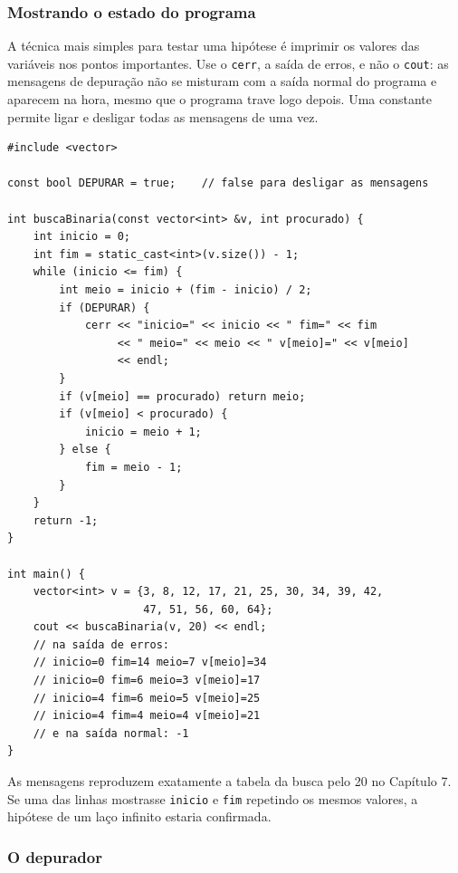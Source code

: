 \subsubsection{Mostrando o estado do programa}

A técnica mais simples para testar uma hipótese é imprimir os valores das variáveis nos pontos importantes. Use o \texttt{cerr}, a saída de erros, e não o \texttt{cout}: as mensagens de depuração não se misturam com a saída normal do programa e aparecem na hora, mesmo que o programa trave logo depois. Uma constante permite ligar e desligar todas as mensagens de uma vez.

\begin{codigo}
\begin{Verbatim}[breaklines=true, breaksymbolleft={}, fontsize=\footnotesize]
#include <vector>

const bool DEPURAR = true;    // false para desligar as mensagens

int buscaBinaria(const vector<int> &v, int procurado) {
    int inicio = 0;
    int fim = static_cast<int>(v.size()) - 1;
    while (inicio <= fim) {
        int meio = inicio + (fim - inicio) / 2;
        if (DEPURAR) {
            cerr << "inicio=" << inicio << " fim=" << fim
                 << " meio=" << meio << " v[meio]=" << v[meio]
                 << endl;
        }
        if (v[meio] == procurado) return meio;
        if (v[meio] < procurado) {
            inicio = meio + 1;
        } else {
            fim = meio - 1;
        }
    }
    return -1;
}

int main() {
    vector<int> v = {3, 8, 12, 17, 21, 25, 30, 34, 39, 42,
                     47, 51, 56, 60, 64};
    cout << buscaBinaria(v, 20) << endl;
    // na saída de erros:
    // inicio=0 fim=14 meio=7 v[meio]=34
    // inicio=0 fim=6 meio=3 v[meio]=17
    // inicio=4 fim=6 meio=5 v[meio]=25
    // inicio=4 fim=4 meio=4 v[meio]=21
    // e na saída normal: -1
}
\end{Verbatim}
\end{codigo}

As mensagens reproduzem exatamente a tabela da busca pelo 20 no Capítulo 7. Se uma das linhas mostrasse \texttt{inicio} e \texttt{fim} repetindo os mesmos valores, a hipótese de um laço infinito estaria confirmada.

\subsubsection{O depurador}

